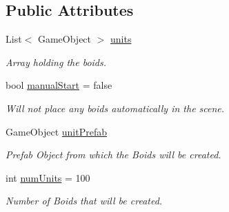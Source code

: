 \subsection*{Public Attributes}
\begin{DoxyCompactItemize}
\item 
\mbox{\label{class_p_s_flocking_1_1_p_s_unit_manager_aedaaee6bb56890420722506563f6b588}} 
List$<$ Game\+Object $>$ \hyperlink{class_p_s_flocking_1_1_p_s_unit_manager_aedaaee6bb56890420722506563f6b588}{units}
\begin{DoxyCompactList}\small\item\em Array holding the boids. \end{DoxyCompactList}\item 
\mbox{\label{class_p_s_flocking_1_1_p_s_unit_manager_a1a733c51307f36d98644e35d833a7955}} 
bool \hyperlink{class_p_s_flocking_1_1_p_s_unit_manager_a1a733c51307f36d98644e35d833a7955}{manual\+Start} = false
\begin{DoxyCompactList}\small\item\em Will not place any boids automatically in the scene. \end{DoxyCompactList}\item 
\mbox{\label{class_p_s_flocking_1_1_p_s_unit_manager_a4d79206a2784be39d27fcb36c91656e4}} 
Game\+Object \hyperlink{class_p_s_flocking_1_1_p_s_unit_manager_a4d79206a2784be39d27fcb36c91656e4}{unit\+Prefab}
\begin{DoxyCompactList}\small\item\em Prefab Object from which the Boids will be created. \end{DoxyCompactList}\item 
\mbox{\label{class_p_s_flocking_1_1_p_s_unit_manager_a765240b34b3a5ce19e6f711798c4d1bf}} 
int \hyperlink{class_p_s_flocking_1_1_p_s_unit_manager_a765240b34b3a5ce19e6f711798c4d1bf}{num\+Units} = 100
\begin{DoxyCompactList}\small\item\em Number of Boids that will be created. \end{DoxyCompactList}\item 
\mbox{\label{class_p_s_flocking_1_1_p_s_unit_manager_aa9c3797d524485b906ca919640f80c57}} 

\end{DoxyCompactItemize}
